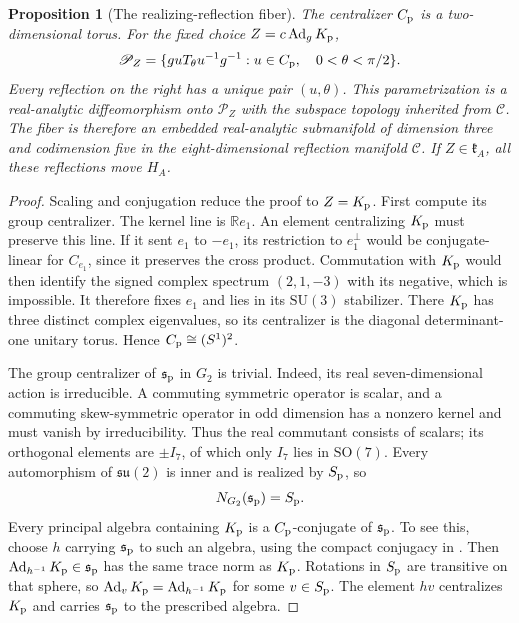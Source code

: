 \documentclass[11pt,a4paper]{article}
\newtheorem{proposition}[proposition]{Proposition}
\newcommand{\RR}{\mathbb R}
\newcommand{\SO}{\mathrm{SO}}
\newcommand{\SU}{\mathrm{SU}}
\newcommand{\Ad}{\operatorname{Ad}}
\begin{document}
\begin{proposition}[The realizing-reflection fiber]\label{prop:principal-reflection-fiber}
The centralizer $C_{\rm p}$ is a two-dimensional torus.  For the fixed choice $Z=c\Ad_gK_{\rm p}$,
\[
\mathscr P_Z
 =\{g uT_\theta u^{-1}g^{-1}:u\in C_{\rm p},\quad 0<\theta<\pi/2\}.
\]
Every reflection on the right has a unique pair $(u,\theta)$.  This parametrization is a real-analytic diffeomorphism onto $\mathscr P_Z$ with the subspace topology inherited from $\mathscr C$.  The fiber is therefore an embedded real-analytic submanifold of dimension three and codimension five in the eight-dimensional reflection manifold $\mathscr C$.
If $Z\in\mathfrak k_A$, all these reflections move $H_A$.
\end{proposition}
\begin{proof}
Scaling and conjugation reduce the proof to $Z=K_{\rm p}$.
First compute its group centralizer.  The kernel line is $\RR e_1$.  An element centralizing $K_{\rm p}$ must preserve this line.
If it sent $e_1$ to $-e_1$, its restriction to $e_1^\perp$ would be conjugate-linear for $C_{e_1}$, since it preserves the cross product.
Commutation with $K_{\rm p}$ would then identify the signed complex spectrum $(2,1,-3)$ with its negative, which is impossible.
It therefore fixes $e_1$ and lies in its $\SU(3)$ stabilizer.
There $K_{\rm p}$ has three distinct complex eigenvalues, so its centralizer is the diagonal determinant-one unitary torus.  Hence $C_{\rm p}\cong(S^1)^2$.

The group centralizer of $\mathfrak s_{\rm p}$ in $G_2$ is trivial.  Indeed, its real seven-dimensional action is irreducible.
A commuting symmetric operator is scalar, and a commuting skew-symmetric operator in odd dimension has a nonzero kernel and must vanish by irreducibility.
Thus the real commutant consists of scalars; its orthogonal elements are $\pm I_7$, of which only $I_7$ lies in $\SO(7)$.
Every automorphism of $\mathfrak{su}(2)$ is inner and is realized by $S_{\rm p}$, so
\[
N_{G_2}(\mathfrak s_{\rm p})=S_{\rm p}.
\]
Every principal algebra containing $K_{\rm p}$ is a $C_{\rm p}$-conjugate of $\mathfrak s_{\rm p}$.
To see this, choose $h$ carrying $\mathfrak s_{\rm p}$ to such an algebra, using the compact conjugacy in .
Then $\Ad_{h^{-1}}K_{\rm p}\in\mathfrak s_{\rm p}$ has the same trace norm as $K_{\rm p}$.
Rotations in $S_{\rm p}$ are transitive on that sphere, so $\Ad_vK_{\rm p}=\Ad_{h^{-1}}K_{\rm p}$ for some $v\in S_{\rm p}$.
The element $hv$ centralizes $K_{\rm p}$ and carries $\mathfrak s_{\rm p}$ to the prescribed algebra.


\end{proof}
\end{document}

